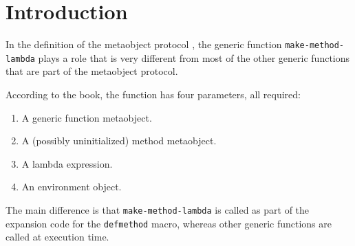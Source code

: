 \section{Introduction}

In the definition of the \commonlisp{} \cite{ansi:common:lisp}
metaobject protocol \cite{Kiczales:1991:AMP:574212}, the generic
function \texttt{make-method-lambda} plays a role that is very
different from most of the other generic functions that are part of
the metaobject protocol.

According to the book, the function has four parameters, all required:

\begin{enumerate}
\item A generic function metaobject.
\item A (possibly uninitialized) method metaobject.
\item A lambda expression.
\item An environment object.
\end{enumerate}

The main difference is that \texttt{make-method-lambda} is called as
part of the expansion code for the \texttt{defmethod} macro, whereas
other generic functions are called at execution time.
